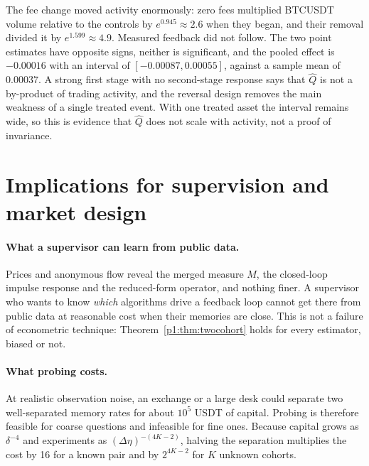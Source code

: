 The fee change moved activity enormously: zero fees multiplied BTCUSDT volume relative to the controls by $e^{0.945}\approx2.6$ when they began, and their removal divided it by $e^{1.599}\approx4.9$. Measured feedback did not follow. The two point estimates have opposite signs, neither is significant, and the pooled effect is $-0.00016$ with an interval of $[-0.00087,0.00055]$, against a sample mean of $0.00037$. A strong first stage with no second-stage response says that $\hat Q$ is not a by-product of trading activity, and the reversal design removes the main weakness of a single treated event. With one treated asset the interval remains wide, so this is evidence that $\hat Q$ does not scale with activity, not a proof of invariance.

\section{Implications for supervision and market design}\label{p1:sec:policy}

\paragraph{What a supervisor can learn from public data.} Prices and anonymous flow reveal the merged measure $M$, the closed-loop impulse response and the reduced-form operator, and nothing finer. A supervisor who wants to know \emph{which} algorithms drive a feedback loop cannot get there from public data at reasonable cost when their memories are close. This is not a failure of econometric technique: Theorem~\ref{p1:thm:twocohort} holds for every estimator, biased or not.

\paragraph{What probing costs.} At realistic observation noise, an exchange or a large desk could separate two well-separated memory rates for about $10^5$ USDT of capital. Probing is therefore feasible for coarse questions and infeasible for fine ones. Because capital grows as $\delta^{-4}$ and experiments as $(\Delta\eta)^{-(4K-2)}$, halving the separation multiplies the cost by 16 for a known pair and by $2^{4K-2}$ for $K$ unknown cohorts.

